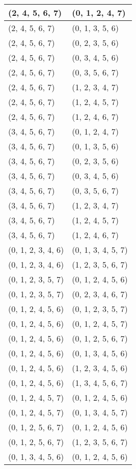 \begin{footnotesize}
\begin{longtable}[c]{|l|l|}
(2, 4, 5, 6, 7)
&(0, 1, 2, 4, 7)
\\ \hline
(2, 4, 5, 6, 7)
&(0, 1, 3, 5, 6)
\\ \hline
(2, 4, 5, 6, 7)
&(0, 2, 3, 5, 6)
\\ \hline
(2, 4, 5, 6, 7)
&(0, 3, 4, 5, 6)
\\ \hline
(2, 4, 5, 6, 7)
&(0, 3, 5, 6, 7)
\\ \hline
(2, 4, 5, 6, 7)
&(1, 2, 3, 4, 7)
\\ \hline
(2, 4, 5, 6, 7)
&(1, 2, 4, 5, 7)
\\ \hline
(2, 4, 5, 6, 7)
&(1, 2, 4, 6, 7)
\\ \hline
(3, 4, 5, 6, 7)
&(0, 1, 2, 4, 7)
\\ \hline
(3, 4, 5, 6, 7)
&(0, 1, 3, 5, 6)
\\ \hline
(3, 4, 5, 6, 7)
&(0, 2, 3, 5, 6)
\\ \hline
(3, 4, 5, 6, 7)
&(0, 3, 4, 5, 6)
\\ \hline
(3, 4, 5, 6, 7)
&(0, 3, 5, 6, 7)
\\ \hline
(3, 4, 5, 6, 7)
&(1, 2, 3, 4, 7)
\\ \hline
(3, 4, 5, 6, 7)
&(1, 2, 4, 5, 7)
\\ \hline
(3, 4, 5, 6, 7)
&(1, 2, 4, 6, 7)
\\ \hline
(0, 1, 2, 3, 4, 6)
&(0, 1, 3, 4, 5, 7)
\\ \hline
(0, 1, 2, 3, 4, 6)
&(1, 2, 3, 5, 6, 7)
\\ \hline
(0, 1, 2, 3, 5, 7)
&(0, 1, 2, 4, 5, 6)
\\ \hline
(0, 1, 2, 3, 5, 7)
&(0, 2, 3, 4, 6, 7)
\\ \hline
(0, 1, 2, 4, 5, 6)
&(0, 1, 2, 3, 5, 7)
\\ \hline
(0, 1, 2, 4, 5, 6)
&(0, 1, 2, 4, 5, 7)
\\ \hline
(0, 1, 2, 4, 5, 6)
&(0, 1, 2, 5, 6, 7)
\\ \hline
(0, 1, 2, 4, 5, 6)
&(0, 1, 3, 4, 5, 6)
\\ \hline
(0, 1, 2, 4, 5, 6)
&(1, 2, 3, 4, 5, 6)
\\ \hline
(0, 1, 2, 4, 5, 6)
&(1, 3, 4, 5, 6, 7)
\\ \hline
(0, 1, 2, 4, 5, 7)
&(0, 1, 2, 4, 5, 6)
\\ \hline
(0, 1, 2, 4, 5, 7)
&(0, 1, 3, 4, 5, 7)
\\ \hline
(0, 1, 2, 5, 6, 7)
&(0, 1, 2, 4, 5, 6)
\\ \hline
(0, 1, 2, 5, 6, 7)
&(1, 2, 3, 5, 6, 7)
\\ \hline
(0, 1, 3, 4, 5, 6)
&(0, 1, 2, 4, 5, 6)

\end{longtable}
\end{footnotesize}
